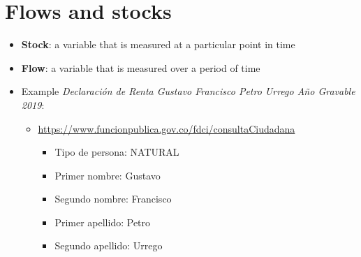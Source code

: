 \documentclass[
  ignorenonframetext,
]{beamer}
\providecommand{\tightlist}{%
  \setlength{\itemsep}{0pt}\setlength{\parskip}{0pt}}\usepackage{longtable,booktabs,array}
\begin{document}
\section{Flows and stocks}\label{flows-and-stocks}

\begin{frame}{}
\label{section-16}
\begin{itemize}
\item
  \textbf{Stock}: a variable that is measured at a particular point in
  time
\item
  \textbf{Flow}: a variable that is measured over a period of time
\item
  Example \emph{Declaración de Renta Gustavo Francisco Petro Urrego Año
  Gravable 2019}:

  \begin{itemize}
  \item
    \url{https://www.funcionpublica.gov.co/fdci/consultaCiudadana}

    \begin{itemize}
    \tightlist
    \item
      Tipo de persona: NATURAL
    \item
      Primer nombre: Gustavo
    \item
      Segundo nombre: Francisco
    \item
      Primer apellido: Petro
    \item
      Segundo apellido: Urrego
    \end{itemize}
  \end{itemize}
\end{itemize}
\end{frame}
\end{document}
